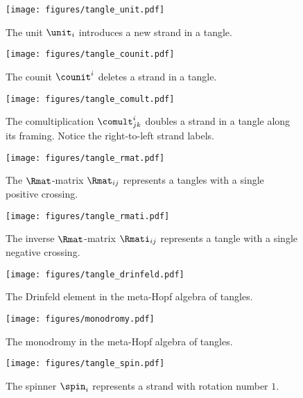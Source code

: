 \begin{figure}[h]
        \centering
        \texttt{[image: figures/tangle\_unit.pdf]}
        \caption{The unit $\unit_i$ introduces a new strand in a tangle.}
        \label{fig:tangle_unit}
\end{figure}
\begin{figure}[h]
        \centering
        \texttt{[image: figures/tangle\_counit.pdf]}
        \caption{The counit $\counit^i$ deletes a strand in a tangle.}
        \label{fig:tangle_counit}
\end{figure}
\begin{figure}[h]
\centering
\texttt{[image: figures/tangle\_comult.pdf]}
\caption{The comultiplication $\comult^{i}_{jk}$ doubles a strand in a tangle
along its framing. Notice the right-to-left strand labels.}
\label{fig:tangle_comult}
\end{figure}
\begin{figure}[h]
        \centering
        \begin{minipage}[c]{0.4\linewidth}
                \centering
                \texttt{[image: figures/tangle\_rmat.pdf]}
                \caption{The $\Rmat$-matrix $\Rmat_{ij}$ represents a tangles with a
                single positive crossing.}
                \label{fig:tangle_rmat}
        \end{minipage}
        \begin{minipage}[c]{0.4\linewidth}
                \centering
                \texttt{[image: figures/tangle\_rmati.pdf]}
                \caption{The inverse $\Rmat$-matrix $\Rmati_{ij}$ represents a
                        tangle with a single negative crossing.}
                \label{fig:tangle_rmati}
        \end{minipage}
\end{figure}
\begin{figure}[h]
        \centering
        \texttt{[image: figures/tangle\_drinfeld.pdf]}
        \caption{The Drinfeld element in the meta-Hopf algebra of tangles.}
        \label{fig:tangle_drinfeld}
\end{figure}
\begin{figure}[h]
        \centering
        \texttt{[image: figures/monodromy.pdf]}
        \caption{The monodromy in the meta-Hopf algebra of tangles.}
        \label{fig:monodromy}
\end{figure}
\begin{figure}[h]
        \centering
        \texttt{[image: figures/tangle\_spin.pdf]}
        \caption{The spinner $\spin_i$ represents a strand with rotation number
        $1$.}
        \label{fig:tangle_spin}
\end{figure}
